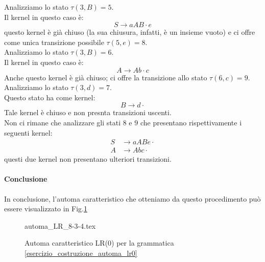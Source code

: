 \documentclass[class=book, crop=false, oneside, 12pt]{standalone}
\begin{document}
Analizziamo lo stato \(\tau (3, B) = 5\). \\
Il kernel in questo caso è:
\begin{equation*}
    S \to aAB \cdot e
\end{equation*}
questo kernel è già chiuso (la sua chiusura, infatti, è un insieme vuoto) e ci offre come unica transizione possibile \(\tau (5, e) = 8\). \\

Analizziamo lo stato \(\tau (3, B) = 6\). \\
Il kernel in questo caso è:
\begin{equation*}
    A \to Ab \cdot c
\end{equation*}
Anche questo kernel è già chiuso; ci offre la transizione allo stato \(\tau (6, c) = 9\). \\

Analizziamo lo stato \(\tau (3, d) = 7\). \\
Questo stato ha come kernel:
\begin{equation*}
    B \to d \cdot 
\end{equation*}
Tale kernel è chiuso e non presnta transizioni uscenti. \\

Non ci rimane che analizzare gli stati \(8\) e \(9\) che presentano rispettivamente i seguenti kernel:
\begin{align*}
    S &\to aABe \cdot \\
    A &\to Abc \cdot
\end{align*}
questi due kernel non presentano ulteriori transizioni.

\paragraph{Conclusione}
In conclusione, l'automa caratteristico che otteniamo da questo procedimento può essere visualizzato in Fig.\ref{charateristic-automata_cosntruction}
\begin{figure}
    \centering
	{automa_LR_8-3-4.tex}
    \caption{Automa caratteristico LR(0) per la grammatica \ref{esercizio_costruzione_automa_lr0}}
    \label{charateristic-automata_cosntruction}    
\end{figure}
\end{document}
